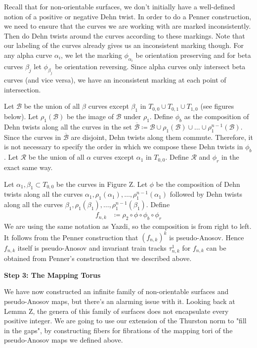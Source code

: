 Recall that for non-orientable surfaces, we don't initially have a well-defined notion of a positive or negative Dehn twist. In order to do a Penner construction, we need to ensure that the curves we are working with are marked inconsistently. Then do Dehn twists around the curves according to these markings. Note that our labeling of the curves already gives us an inconsistent marking though. For any alpha curve $\alpha_i$, we let the marking $\phi_{\alpha_i}$ be orientation preserving and for beta curves $\beta_j$ let $\phi_{\beta_j}$ be orientation reversing. Since alpha curves only intersect beta curves (and vice versa), we have an inconsistent marking at each point of intersection.

Let $\mathcal{B}$ be the union of all $\beta$ curves except $\beta_1$ in $T_{0,0} \cup T_{0,1} \cup T_{1,0}$ (see figures below). Let $\rho_1(\mathcal{B})$ be the image of $\mathcal{B}$ under $\rho_1$. Define $\phi_b$ as the composition of Dehn twists along all the curves in the set $\overline{\mathcal{B}} \coloneqq \mathcal{B} \cup \rho_1(\mathcal{B}) \cup \dots \cup \rho_1^{n-1}(\mathcal{B})$. Since the curves in $\overline{\mathcal{B}}$ are disjoint, Dehn twists along them commute. Therefore, it is not necessary to specify the order in which we compose these Dehn twists in $\phi_b$. Let $\mathcal{R}$ be the union of all $\alpha$ curves except $\alpha_1$ in $T_{0,0}$. Define $\mathcal{R}$ and $\phi_r$ in the exact same way.

Let $\alpha_1,\beta_1 \subset T_{0,0}$ be the curves in Figure Z. Let $\phi$ be the composition of Dehn twists along all the curves $\alpha_1, \rho_1(\alpha_1), \dots, \rho_1^{n-1}(\alpha_1)$ followed by Dehn twists along all the curves $\beta_1,\rho_1(\beta_1),\dots,\rho_1^{n-1}(\beta_1)$. Define
\begin{align*}
    f_{n,k} &\coloneqq \rho_2 \circ \phi \circ \phi_b \circ \phi_r 
\end{align*}
We are using the same notation as Yazdi, so the composition is from right to left. It follows from the Penner construction that $(f_{n,k})^k$ is pseudo-Anosov. Hence $f_{n,k}$ itself is pseudo-Anosov and invariant train tracks $\tau^1_{n,k}$ for $f_{n,k}$ can be obtained from Penner's construction that we described above. 

\textbf{Step 3: The Mapping Torus}

We have now constructed an infinite family of non-orientable surfaces and pseudo-Anosov maps, but there's an alarming issue with it. Looking back at Lemma Z, the genera of this family of surfaces does not encapsulate every positive integer. We are going to use our extension of the Thurston norm to "fill in the gaps", by constructing fibers for fibrations of the mapping tori of the pseudo-Anosov maps we defined above.

